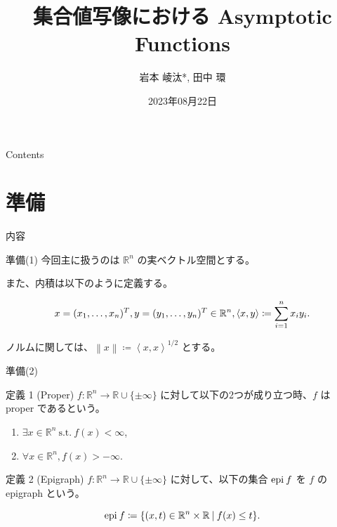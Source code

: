 \documentclass[aspectratio=169, dvipdfmx, 11pt]{beamer} %
\title[博士後期課程入学試験]{集合値写像における Asymptotic Functions}
\author[岩本 崚汰]{岩本 崚汰*, 田中 環}
\institute[新潟大学大学院自然科学研究科]{新潟大学大学院自然科学研究科}
\date{2023年08月22日}
\newcommand{\RealNumberSet}{\mathbb{R}}
\newcommand{\NDemenstionalRealEuclideanSpace}{\mathbb{R}^n}
\newcommand{\Epigraph}[1]{\text{epi\:${#1}$}} %
\newcommand{\SuchThat}{\:\text{s.t.}\:}
\newcommand{\SetForm}[2]{
  \{{#1}\:|\:{#2}\}
}
\begin{document}
\maketitle

\begin{frame}{Contents}
  \tableofcontents
\end{frame}

\section{準備}
\begin{frame}{内容}
  \tableofcontents[currentsection]
\end{frame}

\begin{frame}{準備(1)}
  今回主に扱うのは $\mathbb{R}^n$ の実ベクトル空間とする。

  また、内積は以下のように定義する。

  \begin{equation}
    x=(x_1,\dots,x_n)^T, y=(y_1,\dots,y_n)^T \in \mathbb{R}^n, \left\langle x,y\right\rangle \coloneqq \sum_{i = 1}^{n} x_i y_i. \notag
  \end{equation}

  ノルムに関しては、$\left\lVert x \right\rVert \coloneqq \left\langle x,x\right\rangle ^{1/2} $ とする。
\end{frame}

\begin{frame}{準備(2)}
  \begin{block}{定義 1 (Proper) \cite{ref1}}
    $f: \NDemenstionalRealEuclideanSpace \rightarrow \RealNumberSet \cup \{\pm \infty\}$ に対して以下の2つが成り立つ時、$f$ は proper であるという。
    \begin{enumerate}
      \item $\exists x \in \NDemenstionalRealEuclideanSpace \SuchThat f(x) < \infty$,
      \item $\forall x \in \NDemenstionalRealEuclideanSpace, f(x) > -\infty$.
    \end{enumerate}
  \end{block}

  \begin{block}{定義 2 (Epigraph) \cite{ref1}}
    $f: \NDemenstionalRealEuclideanSpace \rightarrow \RealNumberSet \cup \{\pm \infty\}$ に対して、以下の集合 $\Epigraph{f}$ を $f$ の epigraph という。

    \begin{equation}
      \Epigraph{f} \coloneqq \SetForm{(x,t) \in \NDemenstionalRealEuclideanSpace \times \RealNumberSet}{f(x) \leq t}. \notag
    \end{equation}
  \end{block}
\end{frame}
\end{document}
